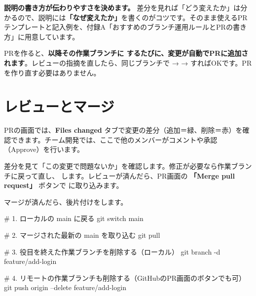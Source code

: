 
\begin{hintbox}
\textbf{説明の書き方が伝わりやすさを決めます。} 差分を見れば「どう変えたか」は分かるので、説明には\textbf{「なぜ変えたか」}を書くのがコツです。そのまま使えるPRテンプレートと記入例を、付録A「おすすめのブランチ運用ルールとPRの書き方」に用意しています。
\end{hintbox}

PRを作ると、\textbf{以降その作業ブランチに  するたびに、変更が自動でPRに追加されます}。レビューの指摘を直したら、同じブランチで  →  →  すればOKです。PRを作り直す必要はありません。

\section{レビューとマージ}

PRの画面では、\textbf{Files changed} タブで変更の差分（追加＝緑、削除＝赤）を確認できます。チーム開発では、ここで他のメンバーがコメントや承認（Approve）を行います。

差分を見て「この変更で問題ないか」を確認します。修正が必要なら作業ブランチに戻って直し、 します。レビューが済んだら、PR画面の \textbf{「Merge pull request」} ボタンで  に取り込みます。


マージが済んだら、後片付けをします。

\begin{codebox}[bash]
\begin{code}
# 1. ローカルの main に戻る
git switch main

# 2. マージされた最新の main を取り込む
git pull

# 3. 役目を終えた作業ブランチを削除する（ローカル）
git branch -d feature/add-login

# 4. リモートの作業ブランチも削除する（GitHubのPR画面のボタンでも可）
git push origin --delete feature/add-login
\end{code}
\end{codebox}

